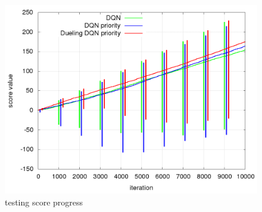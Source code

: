 \documentclass[10pt,a4paper]{article}
\begin{document}
\begin{figure}[!htb]
  \centering
  \includegraphics[scale=0.4]{../../rl_results/dqn_test/rl_progress_testing.png}
  \caption{testing score progress}
  \label{img:dqn_test_testing_progress}
\end{figure}
\end{document}
